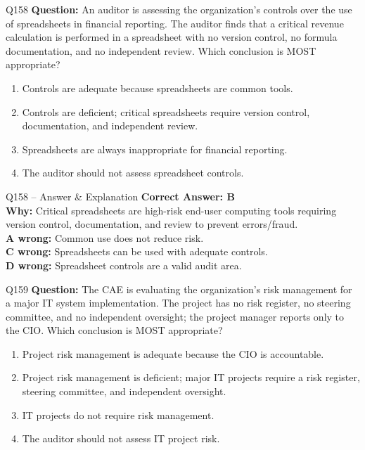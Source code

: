 \documentclass[aspectratio=169,10pt]{beamer}
\begin{document}
	\begin{frame}[t]{Q158}
		\small
		\textbf{Question:} An auditor is assessing the organization's controls over the use of spreadsheets in financial reporting. The auditor finds that a critical revenue calculation is performed in a spreadsheet with no version control, no formula documentation, and no independent review. Which conclusion is MOST appropriate?
		\begin{enumerate}[label=\Alph*.,itemsep=1pt,topsep=2pt]
			\item Controls are adequate because spreadsheets are common tools.
			\item Controls are deficient; critical spreadsheets require version control, documentation, and independent review.
			\item Spreadsheets are always inappropriate for financial reporting.
			\item The auditor should not assess spreadsheet controls.
		\end{enumerate}
	\end{frame}
	
	\begin{frame}[t]{Q158 -- Answer \& Explanation}
		\small
		\textbf{Correct Answer: B} \\[4pt]
		\textbf{Why:} Critical spreadsheets are high-risk end-user computing tools requiring version control, documentation, and review to prevent errors/fraud. \\[4pt]
		\textbf{A wrong:} Common use does not reduce risk. \\[2pt]
		\textbf{C wrong:} Spreadsheets can be used with adequate controls. \\[2pt]
		\textbf{D wrong:} Spreadsheet controls are a valid audit area.
	\end{frame}
	
	\begin{frame}[t]{Q159}
		\small
		\textbf{Question:} The CAE is evaluating the organization's risk management for a major IT system implementation. The project has no risk register, no steering committee, and no independent oversight; the project manager reports only to the CIO. Which conclusion is MOST appropriate?
		\begin{enumerate}[label=\Alph*.,itemsep=1pt,topsep=2pt]
			\item Project risk management is adequate because the CIO is accountable.
			\item Project risk management is deficient; major IT projects require a risk register, steering committee, and independent oversight.
			\item IT projects do not require risk management.
			\item The auditor should not assess IT project risk.
		\end{enumerate}
	\end{frame}
	
\end{document}
